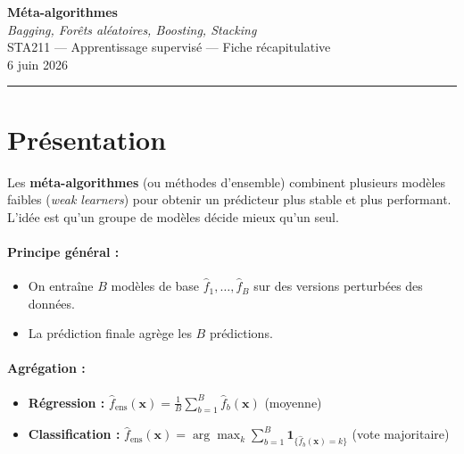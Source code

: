 \documentclass[a4paper,11pt]{article}
\begin{document}
\begin{center}
{\LARGE\textbf{Méta-algorithmes}} \\
\vspace{0.2cm}
{\large \textit{Bagging, Forêts aléatoires, Boosting, Stacking}} \\
\vspace{0.3cm}
STA211 — Apprentissage supervisé — Fiche récapitulative \\
6 juin 2026
\end{center}

\vspace{0.3cm}
\rule{\textwidth}{0.4pt}
\vspace{0.3cm}

\tableofcontents
\newpage

\section{Présentation}

Les \textbf{méta-algorithmes} (ou méthodes d'ensemble) combinent plusieurs modèles faibles (\textit{weak learners}) pour obtenir un prédicteur plus stable et plus performant. L'idée est qu'un groupe de modèles décide mieux qu'un seul.

\paragraph{Principe général :}
\begin{itemize}
    \item On entraîne $B$ modèles de base $\hat{f}_1, \ldots, \hat{f}_B$ sur des versions perturbées des données.
    \item La prédiction finale agrège les $B$ prédictions.
\end{itemize}

\paragraph{Agrégation :}
\begin{itemize}
    \item \textbf{Régression :} $\displaystyle \hat{f}_{\text{ens}}(\mathbf{x}) = \frac{1}{B}\sum_{b=1}^{B} \hat{f}_b(\mathbf{x})$ \hfill (moyenne)
    \item \textbf{Classification :} $\displaystyle \hat{f}_{\text{ens}}(\mathbf{x}) = \arg\max_k \sum_{b=1}^{B} \mathbf{1}_{\{\hat{f}_b(\mathbf{x}) = k\}}$ \hfill (vote majoritaire)
\end{itemize}
\end{document}
